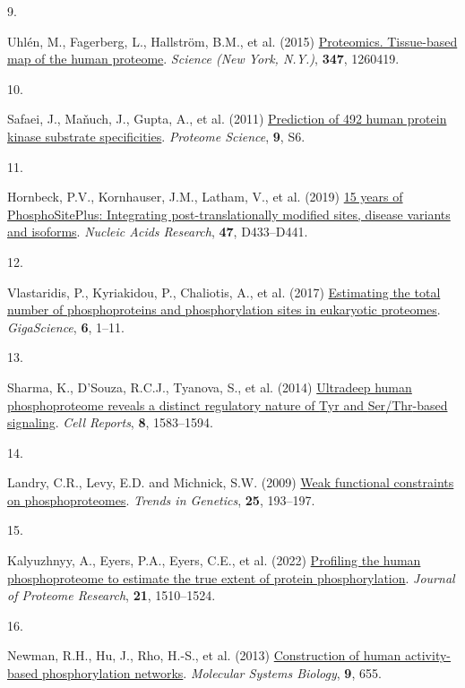 \documentclass[
]{article}
\newlength{\cslhangindent}
\newlength{\csllabelwidth}
\newenvironment{CSLReferences}[2] %
 {\begin{list}{}{%
  \setlength{\itemindent}{0pt}
  \setlength{\leftmargin}{0pt}
  \setlength{\parsep}{0pt}
  \ifodd #1
   \setlength{\leftmargin}{\cslhangindent}
   \setlength{\itemindent}{-1\cslhangindent}
  \fi
  \setlength{\itemsep}{#2\baselineskip}}}
 {\end{list}}
\newcommand{\CSLLeftMargin}[1]{\parbox[t]{\csllabelwidth}{\strut#1\strut}}
\newcommand{\CSLRightInline}[1]{\parbox[t]{\linewidth - \csllabelwidth}{\strut#1\strut}}
\begin{document}
\begin{CSLReferences}{0}{0}
\CSLLeftMargin{9. }%
\CSLRightInline{Uhlén, M., Fagerberg, L., Hallström, B.M., et al. (2015)
\href{https://doi.org/10.1126/science.1260419}{Proteomics. Tissue-based
map of the human proteome}. \emph{Science (New York, N.Y.)},
\textbf{347}, 1260419.}

\CSLLeftMargin{10. }%
\CSLRightInline{Safaei, J., Maňuch, J., Gupta, A., et al. (2011)
\href{https://doi.org/10.1186/1477-5956-9-S1-S6}{Prediction of 492 human
protein kinase substrate specificities}. \emph{Proteome Science},
\textbf{9}, S6.}

\CSLLeftMargin{11. }%
\CSLRightInline{Hornbeck, P.V., Kornhauser, J.M., Latham, V., et al.
(2019) \href{https://doi.org/10.1093/nar/gky1159}{15 years of
{PhosphoSitePlus}: Integrating post-translationally modified sites,
disease variants and isoforms}. \emph{Nucleic Acids Research},
\textbf{47}, D433--D441.}

\CSLLeftMargin{12. }%
\CSLRightInline{Vlastaridis, P., Kyriakidou, P., Chaliotis, A., et al.
(2017) \href{https://doi.org/10.1093/gigascience/giw015}{Estimating the
total number of phosphoproteins and phosphorylation sites in eukaryotic
proteomes}. \emph{GigaScience}, \textbf{6}, 1--11.}

\CSLLeftMargin{13. }%
\CSLRightInline{Sharma, K., D'Souza, R.C.J., Tyanova, S., et al. (2014)
\href{https://doi.org/10.1016/j.celrep.2014.07.036}{Ultradeep human
phosphoproteome reveals a distinct regulatory nature of {Tyr} and
{Ser}/{Thr}-based signaling}. \emph{Cell Reports}, \textbf{8},
1583--1594.}

\CSLLeftMargin{14. }%
\CSLRightInline{Landry, C.R., Levy, E.D. and Michnick, S.W. (2009)
\href{https://doi.org/10.1016/j.tig.2009.03.003}{Weak functional
constraints on phosphoproteomes}. \emph{Trends in Genetics},
\textbf{25}, 193--197.}

\CSLLeftMargin{15. }%
\CSLRightInline{Kalyuzhnyy, A., Eyers, P.A., Eyers, C.E., et al. (2022)
\href{https://doi.org/10.1021/acs.jproteome.2c00131}{Profiling the human
phosphoproteome to estimate the true extent of protein phosphorylation}.
\emph{Journal of Proteome Research}, \textbf{21}, 1510--1524.}

\CSLLeftMargin{16. }%
\CSLRightInline{{Newman, R.H., Hu, J., Rho, H.-S., et al.} (2013)
\href{https://doi.org/10.1038/msb.2013.12}{Construction of human
activity-based phosphorylation networks}. \emph{Molecular Systems
Biology}, \textbf{9}, 655.}


\end{CSLReferences}
\end{document}
